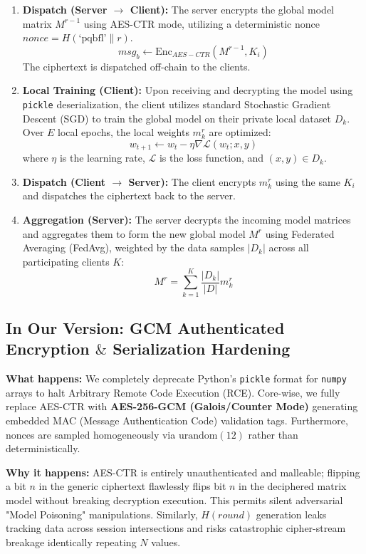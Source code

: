 \documentclass[12pt]{article}
\begin{document}
\begin{enumerate}
    \item \textbf{Dispatch (Server $\to$ Client):} The server encrypts the global model matrix $M^{r-1}$ using AES-CTR mode, utilizing a deterministic nonce $nonce = H(\text{`pqbfl'} \parallel r)$.
    \[
    msg_b \leftarrow \text{Enc}_{AES-CTR}(M^{r-1}, K_i)
    \]
    The ciphertext is dispatched off-chain to the clients.
    
    \item \textbf{Local Training (Client):} Upon receiving and decrypting the model using \verb|pickle| deserialization, the client utilizes standard Stochastic Gradient Descent (SGD) to train the global model on their private local dataset $D_k$. Over $E$ local epochs, the local weights $m_k^{r}$ are optimized:
    \[
    w_{t+1} \leftarrow w_t - \eta \nabla \mathcal{L}(w_t; x, y)
    \]
    where $\eta$ is the learning rate, $\mathcal{L}$ is the loss function, and $(x, y) \in D_k$.
    
    \item \textbf{Dispatch (Client $\to$ Server):} The client encrypts $m_k^{r}$ using the same $K_i$ and dispatches the ciphertext back to the server.
    
    \item \textbf{Aggregation (Server):} The server decrypts the incoming model matrices and aggregates them to form the new global model $M^{r}$ using Federated Averaging (FedAvg), weighted by the data samples $|D_k|$ across all participating clients $K$:
    \[
    M^{r} = \sum_{k=1}^K \frac{|D_k|}{|D|} m_k^{r}
    \]
\end{enumerate}

\subsection*{In Our Version: GCM Authenticated Encryption $\&$ Serialization Hardening}
\textbf{What happens:} We completely deprecate Python's \verb|pickle| format for \verb|numpy| arrays to halt Arbitrary Remote Code Execution (RCE). Core-wise, we fully replace AES-CTR with \textbf{AES-256-GCM (Galois/Counter Mode)} generating embedded MAC (Message Authentication Code) validation tags. Furthermore, nonces are sampled homogeneously via $\text{urandom}(12)$ rather than deterministically.

\textbf{Why it happens:}
AES-CTR is entirely unauthenticated and malleable; flipping a bit $n$ in the generic ciphertext flawlessly flips bit $n$ in the deciphered matrix model without breaking decryption execution. This permits silent adversarial "Model Poisoning" manipulations. Similarly, $H(round)$ generation leaks tracking data across session intersections and risks catastrophic cipher-stream breakage identically repeating $N$ values. 
\end{document}
